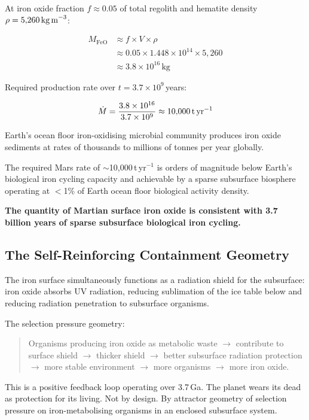 \documentclass[11pt, a4paper]{article}
\begin{document}
At iron oxide fraction $f \approx 0.05$
of total regolith and hematite density
$\rho = 5{,}260\,\text{kg\,m}^{-3}$:

\begin{align}
M_{\text{FeO}} &\approx
  f \times V \times \rho \nonumber \\
&\approx 0.05 \times
  1.448 \times 10^{14} \times 5{,}260 \nonumber \\
&\approx 3.8 \times 10^{16}\,\text{kg}
\end{align}

Required production rate over
$t = 3.7 \times 10^9$\,years:

\begin{equation}
\dot{M} = \frac{3.8 \times 10^{16}}{3.7 \times 10^9}
  \approx 10{,}000\,\text{t\,yr}^{-1}
\end{equation}

Earth's ocean floor iron-oxidising
microbial community produces iron oxide
sediments at rates of thousands to
millions of tonnes per year globally.

The required Mars rate of
$\sim$10{,}000\,t\,yr$^{-1}$ is orders of
magnitude below Earth's biological iron
cycling capacity and achievable by a
sparse subsurface biosphere operating
at $<$1\% of Earth ocean floor biological
activity density.

\textbf{The quantity of Martian surface iron
oxide is consistent with 3.7 billion years
of sparse subsurface biological iron cycling.}

\subsection{The Self-Reinforcing Containment
Geometry}

The iron surface simultaneously functions
as a radiation shield for the subsurface:
iron oxide absorbs UV radiation, reducing
sublimation of the ice table below and
reducing radiation penetration to
subsurface organisms.

The selection pressure geometry:

\begin{quote}
Organisms producing iron oxide as metabolic
waste $\rightarrow$ contribute to surface
shield $\rightarrow$ thicker shield $\rightarrow$
better subsurface radiation protection
$\rightarrow$ more stable environment
$\rightarrow$ more organisms
$\rightarrow$ more iron oxide.
\end{quote}

This is a positive feedback loop operating
over 3.7\,Ga. The planet wears its dead as
protection for its living. Not by design.
By attractor geometry of selection pressure
on iron-metabolising organisms in an enclosed
subsurface system.
\end{document}

